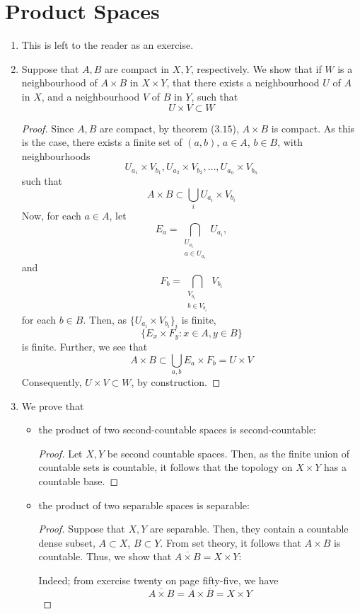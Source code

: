 \documentclass{book}
\begin{document}
\section{Product Spaces} \label{sec:productspaces}
\begin{enumerate}[(1)]
    \item This is left to the reader as an exercise.

    \item Suppose that $A,B$ are compact in $X,Y$, respectively. We show that if $W$ is a neighbourhood of $A \times B$ in $X \times Y$, that there exists a neighbourhood $U$ of $A$ in $X$, and a neighbourhood $V$ of $B$ in $Y$, such that 
        \[U \times V \subset W\]
        \begin{proof}  Since $A, B$ are compact, by theorem ($3.15$), $A \times B$ is compact. As this is the case, there exists a finite set of $(a,b)$, $a \in A$, $b \in B$, with neighbourhoods 
            \[U_{a_1} \times V_{b_1}, U_{a_2} \times V_{b_2} , \dots , U_{a_n} \times V_{b_n} \]
            such that 
            \[A \times B \subset \bigcup_i U_{a_i} \times V_{b_i}\]
            Now, for each $a \in A$, let 
            \[E_a = \bigcap_{\substack{U_{a_i} \\ a \in U_{a_i} }} U_{a_i},\]
            and 
            \[F_b = \bigcap_{\substack{V_{b_i} \\ b \in V_{b_i} }} V_{b_i}\]
            for each $b \in B$. Then, as $\{U_{a_i} \times V_{b_i}\}_i$ is finite, 
            \[ \{ E_x \times F_y : x \in A, y \in B \}\]
            is finite. Further, we see that 
            \[A \times B \subset \bigcup_{a,b} E_a \times F_b = U \times V\]
            Consequently, $U \times V \subset W$, by construction. 
        \end{proof}

    \item We prove that 
        \begin{itemize}
            \item the product of two second-countable spaces is second-countable: 
                \begin{proof} Let $X,Y$ be second countable spaces. Then, as the finite union of countable sets is countable, it follows that the topology on $X \times Y$ has a countable base. 
                \end{proof}
            \item the product of two separable spaces is separable: 
                \begin{proof} Suppose that $X,Y$ are separable. Then, they contain a countable dense subset, $A \subset X$, $B \subset Y$. From set theory, it follows that $A \times B$ is countable. Thus, we show that $\overline{A \times B} = X \times Y$: 
                    \par Indeed; from exercise twenty on page fifty-five, we have 
                    \[\overline{A \times B} = \overline{A} \times \overline{B} = X \times Y\]
                \end{proof}
        \end{itemize}


\end{enumerate}
\end{document}
